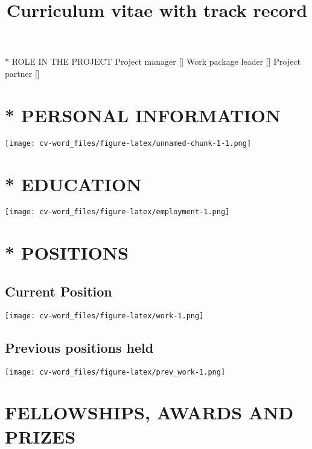 \documentclass[]{article}
\title{Curriculum vitae with track record}
\author{}
\date{\vspace{-2.5em}}
\begin{document}
\maketitle

{* ROLE IN THE PROJECT} Project manager {[}{]} Work package leader
{[}{]} Project partner {[}{]}

\hypertarget{personal-information}{%
\section{* PERSONAL INFORMATION}\label{personal-information}}

\texttt{[image: cv-word\_files/figure-latex/unnamed-chunk-1-1.png]}

\hypertarget{education}{%
\section{* EDUCATION}\label{education}}

\texttt{[image: cv-word\_files/figure-latex/employment-1.png]}

\hypertarget{positions}{%
\section{* POSITIONS}\label{positions}}

\hypertarget{current-position}{%
\subsection{Current Position}\label{current-position}}

\texttt{[image: cv-word\_files/figure-latex/work-1.png]}

\hypertarget{previous-positions-held}{%
\subsection{Previous positions held}\label{previous-positions-held}}

\texttt{[image: cv-word\_files/figure-latex/prev\_work-1.png]}

\hypertarget{fellowships-awards-and-prizes}{%
\section{FELLOWSHIPS, AWARDS AND
PRIZES}\label{fellowships-awards-and-prizes}}
\end{document}
